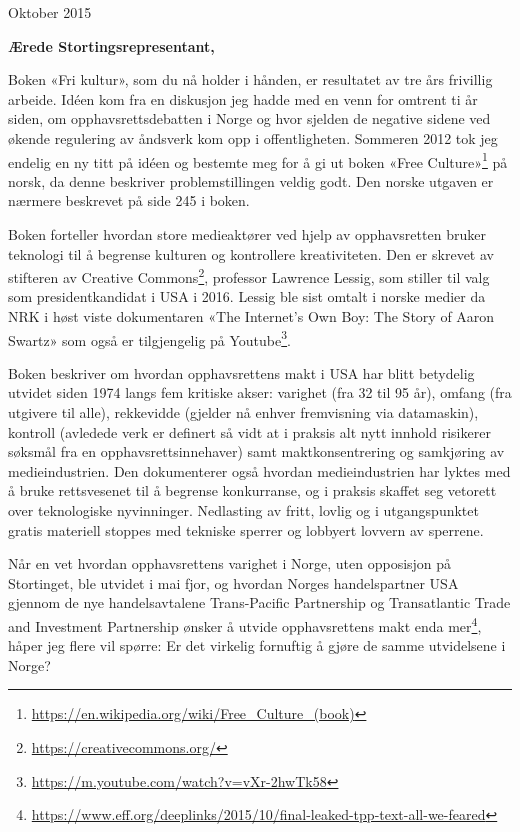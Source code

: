 \documentclass[a4paper, 11pt, norsk]{article}
\begin{document}
\begin{flushright} Oktober 2015 \end{flushright}

{\bf Ærede Stortingsrepresentant,}

Boken «Fri kultur», som du nå holder i hånden, er resultatet av tre
års frivillig arbeide.  Idéen kom fra en diskusjon jeg hadde med en
venn for omtrent ti år siden, om opphavsrettsdebatten i Norge og hvor
sjelden de negative sidene ved økende regulering av åndsverk kom opp i
offentligheten.  Sommeren 2012 tok jeg endelig en ny titt på idéen og
bestemte meg for å gi ut boken «Free
  Culture»\footnote{\url{https://en.wikipedia.org/wiki/Free_Culture_(book)}}
på norsk, da denne beskriver problemstillingen veldig godt.  Den
norske utgaven er nærmere beskrevet på side 245 i boken.

Boken forteller hvordan store medieaktører ved hjelp av opphavsretten
bruker teknologi til å begrense kulturen og kontrollere kreativiteten.
Den er skrevet av stifteren av Creative
Commons\footnote{\url{https://creativecommons.org/}}, professor
Lawrence Lessig, som stiller til valg som presidentkandidat i USA i
2016.  Lessig ble sist omtalt i norske medier da NRK i høst viste
dokumentaren «The Internet's Own Boy: The Story of Aaron Swartz» som
også er tilgjengelig på
Youtube\footnote{\url{https://m.youtube.com/watch?v=vXr-2hwTk58}}.

Boken beskriver om hvordan opphavsrettens makt i USA har blitt
betydelig utvidet siden 1974 langs fem kritiske akser: varighet (fra
32 til 95 år), omfang (fra utgivere til alle), rekkevidde (gjelder nå
enhver fremvisning via datamaskin), kontroll (avledede verk er
definert så vidt at i praksis alt nytt innhold risikerer søksmål fra
en opphavsrettsinnehaver) samt maktkonsentrering og samkjøring av
medieindustrien.  Den dokumenterer også hvordan medieindustrien har
lyktes med å bruke rettsvesenet til å begrense konkurranse, og i
praksis skaffet seg vetorett over teknologiske nyvinninger. Nedlasting
av fritt, lovlig og i utgangspunktet gratis materiell stoppes med
tekniske sperrer og lobbyert lovvern av sperrene.

Når en vet hvordan opphavsrettens varighet i Norge, uten opposisjon på
Stortinget, ble utvidet i mai fjor, og hvordan Norges handelspartner
USA gjennom de nye handelsavtalene Trans-Pacific Partnership og
Transatlantic Trade and Investment Partnership ønsker å utvide
opphavsrettens makt enda
mer\footnote{\url{https://www.eff.org/deeplinks/2015/10/final-leaked-tpp-text-all-we-feared}},
håper jeg flere vil spørre: Er det virkelig fornuftig å gjøre de samme
utvidelsene i Norge?
\end{document}
